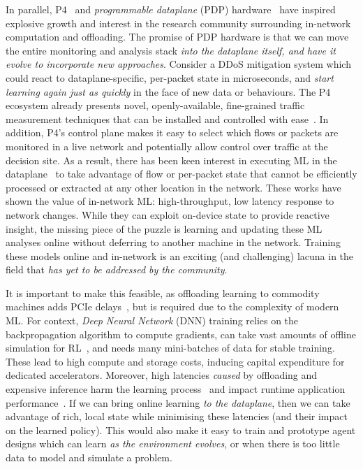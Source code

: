 \documentclass[
sigconf,natbib=false
]{acmart}
\begin{document}
In parallel, P4~\parencite{DBLP:journals/ccr/BosshartDGIMRSTVVW14} and \emph{programmable dataplane} (PDP) hardware~\parencite{DBLP:journals/micro/ZilbermanACM14, netronome-smartnic, xilinx-alveo, barefoot-intel} have inspired explosive growth and interest in the research community surrounding in-network computation and offloading.
The promise of PDP hardware is that we can move the entire monitoring and analysis stack \emph{into the dataplane itself, and have it evolve to incorporate new approaches}.
Consider a DDoS mitigation system which could react to dataplane-specific, per-packet state in microseconds, and \emph{start learning again just as quickly} in the face of new data or behaviours.
The P4 ecosystem already presents novel, openly-available, fine-grained traffic measurement techniques that can be installed and controlled with ease~\parencite{DBLP:conf/sigcomm/GuptaHCFRW18,DBLP:conf/sigcomm/ChenFKRR18,DBLP:conf/sosr/GhasemiBR17}.
In addition, P4's control plane makes it easy to select which flows or packets are monitored in a live network and potentially allow control over traffic at the decision site.
As a result, there has been keen interest in executing ML in the dataplane~\parencite{DBLP:conf/hotnets/XiongZ19,DBLP:conf/sigcomm/SanvitoSB18,DBLP:journals/corr/abs-1801-05731,DBLP:journals/corr/abs-2009-02353,langlet-ml-netronome,DBLP:journals/corr/abs-2002-08987} to take advantage of flow or per-packet state that cannot be efficiently processed or extracted at any other location in the network.
These works have shown the value of in-network ML: high-throughput, low latency response to network changes.
While they can exploit on-device state to provide reactive insight, the missing piece of the puzzle is learning and updating these ML analyses online without deferring to another machine in the network.
Training these models online and in-network is an exciting (and challenging) lacuna in the field that \emph{has yet to be addressed by the community}.

It is important to make this feasible, as offloading learning to commodity machines adds PCIe delays~\parencite{DBLP:journals/corr/abs-2009-02353,DBLP:conf/sigcomm/NeugebauerAZAL018}, but is required due to the complexity of modern ML.
For context, \emph{Deep Neural Network} (DNN) training relies on the backpropagation algorithm to compute gradients, can take vast amounts of offline simulation for RL~\parencite{DBLP:journals/corr/abs-1912-06680}, and needs many mini-batches of data for stable training.
These lead to high compute and storage costs, inducing capital expenditure for dedicated accelerators.
Moreover, high latencies \emph{caused} by offloading and expensive inference harm the learning process~\parencite{DBLP:journals/firai/TravnikMSP18} and impact runtime application performance~\parencite{DBLP:journals/corr/abs-1910-04054}.
If we can bring online learning \emph{to the dataplane}, then we can take advantage of rich, local state while minimising these latencies (and their impact on the learned policy).
This would also make it easy to train and prototype agent designs which can learn \emph{as the environment evolves}, or when there is too little data to model and simulate a problem.
\end{document}

